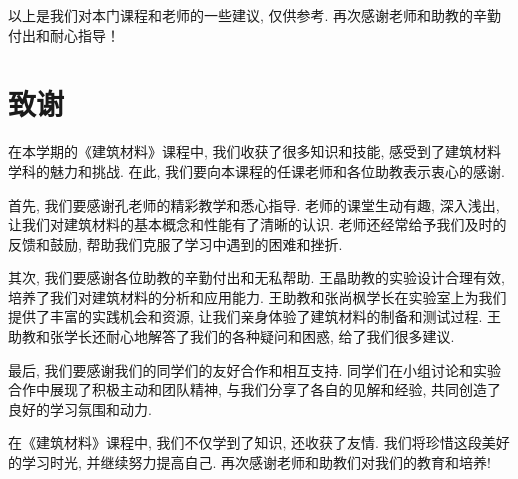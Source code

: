 以上是我们对本门课程和老师的一些建议, 仅供参考.
再次感谢老师和助教的辛勤付出和耐心指导！

\section{致谢}

在本学期的《建筑材料》课程中, 我们收获了很多知识和技能, 感受到了建筑材料学科的魅力和挑战.
在此, 我们要向本课程的任课老师和各位助教表示衷心的感谢.

首先, 我们要感谢孔老师的精彩教学和悉心指导.
老师的课堂生动有趣, 深入浅出, 让我们对建筑材料的基本概念和性能有了清晰的认识.
老师还经常给予我们及时的反馈和鼓励, 帮助我们克服了学习中遇到的困难和挫折.

其次, 我们要感谢各位助教的辛勤付出和无私帮助.
王晶助教的实验设计合理有效, 培养了我们对建筑材料的分析和应用能力.
王助教和张尚枫学长在实验室上为我们提供了丰富的实践机会和资源, 让我们亲身体验了建筑材料的制备和测试过程.
王助教和张学长还耐心地解答了我们的各种疑问和困惑, 给了我们很多建议.

最后, 我们要感谢我们的同学们的友好合作和相互支持.
同学们在小组讨论和实验合作中展现了积极主动和团队精神, 与我们分享了各自的见解和经验, 共同创造了良好的学习氛围和动力.

在《建筑材料》课程中, 我们不仅学到了知识, 还收获了友情.
我们将珍惜这段美好的学习时光, 并继续努力提高自己.
再次感谢老师和助教们对我们的教育和培养!
